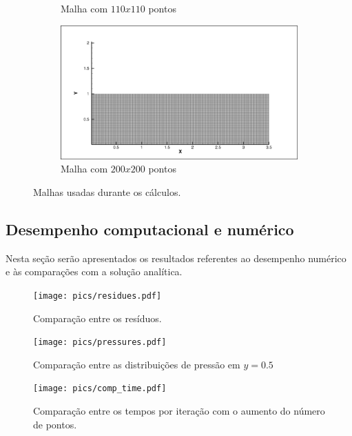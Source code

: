 \documentclass[a4paper, twoside, 12pt]{article}
\numberwithin{equation}{section}
\begin{document}
\begin{figure}[H]
\begin{subfigure}{.5\textwidth}
        \caption{Malha com $110x110$ pontos}
        \label{fig:sfig1}
        \end{subfigure}%
        \begin{subfigure}{.5\textwidth}
        \centering
        \includegraphics[width=.9\linewidth]{pics/mesh_200200.png}
        \caption{Malha com $200x200$ pontos}
        \label{fig:sfig2}
        \end{subfigure}

        \caption{Malhas usadas durante os cálculos.}
        \label{fig:fig}
        \vspace*{-5pt}
        \end{figure}

    \subsection{Desempenho computacional e numérico}
Nesta seção serão apresentados os resultados referentes ao desempenho numérico e às comparações com a solução analítica.
        \begin{figure}[H]
            \centering
            \texttt{[image: pics/residues.pdf]}
            \caption{Comparação entre os resíduos.}
            \vspace*{-5pt}
        \end{figure}

        \begin{figure}[H]
            \centering
            \texttt{[image: pics/pressures.pdf]}
            \caption{Comparação entre as distribuições de pressão em $y=0.5$}
            \vspace*{-5pt}
        \end{figure}

        \begin{figure}[htb]
            \centering
                \texttt{[image: pics/comp\_time.pdf]}
            \caption{Comparação entre os tempos por iteração com o aumento do número de pontos.}
            \vspace*{-5pt}
        \end{figure}
\end{document}
